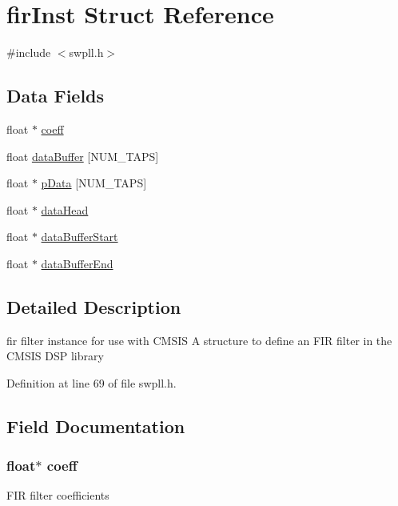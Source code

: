 \hypertarget{structfir_inst}{\section{fir\+Inst Struct Reference}
\label{structfir_inst}
}


{\ttfamily \#include $<$swpll.\+h$>$}

\subsection*{Data Fields}
\begin{DoxyCompactItemize}
\item 
float $\ast$ \hyperlink{structfir_inst_ad36118e15dd4ea6b2ed6f750e5782431}{coeff}
\item 
float \hyperlink{structfir_inst_ac14aaae21e04566f810b07f12356391d}{data\+Buffer} \mbox{[}N\+U\+M\+\_\+\+T\+A\+P\+S\mbox{]}
\item 
float $\ast$ \hyperlink{structfir_inst_aa21e5782bc05c93169c05e3482a44e1d}{p\+Data} \mbox{[}N\+U\+M\+\_\+\+T\+A\+P\+S\mbox{]}
\item 
float $\ast$ \hyperlink{structfir_inst_a36450131e3f9237482ea9759dc23117a}{data\+Head}
\item 
float $\ast$ \hyperlink{structfir_inst_a091a490fe2e1bfccc41e380571b805b4}{data\+Buffer\+Start}
\item 
float $\ast$ \hyperlink{structfir_inst_a37651cee0a39534fd328bea7a9544e64}{data\+Buffer\+End}
\end{DoxyCompactItemize}


\subsection{Detailed Description}
fir filter instance for use with C\+M\+S\+I\+S A structure to define an F\+I\+R filter in the C\+M\+S\+I\+S D\+S\+P library 

Definition at line 69 of file swpll.\+h.



\subsection{Field Documentation}
\hypertarget{structfir_inst_ad36118e15dd4ea6b2ed6f750e5782431}{
\subsubsection[{coeff}]{\setlength{\rightskip}{0pt plus 5cm}float$\ast$ coeff}}\label{structfir_inst_ad36118e15dd4ea6b2ed6f750e5782431}
F\+I\+R filter coefficients 

